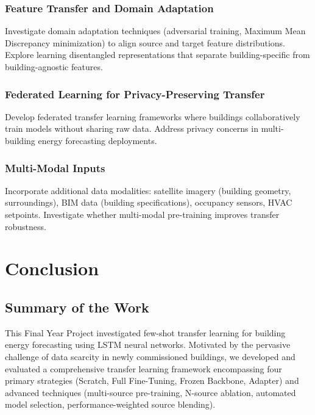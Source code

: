 \documentclass[12pt,a4paper]{report}
\begin{document}
\subsection{Feature Transfer and Domain Adaptation}

Investigate domain adaptation techniques (adversarial training, Maximum Mean Discrepancy minimization) to align source and target feature distributions. Explore learning disentangled representations that separate building-specific from building-agnostic features.

\subsection{Federated Learning for Privacy-Preserving Transfer}

Develop federated transfer learning frameworks where buildings collaboratively train models without sharing raw data. Address privacy concerns in multi-building energy forecasting deployments.

\subsection{Multi-Modal Inputs}

Incorporate additional data modalities: satellite imagery (building geometry, surroundings), BIM data (building specifications), occupancy sensors, HVAC setpoints. Investigate whether multi-modal pre-training improves transfer robustness.


\chapter{Conclusion}

\section{Summary of the Work}

This Final Year Project investigated few-shot transfer learning for building energy forecasting using LSTM neural networks. Motivated by the pervasive challenge of data scarcity in newly commissioned buildings, we developed and evaluated a comprehensive transfer learning framework encompassing four primary strategies (Scratch, Full Fine-Tuning, Frozen Backbone, Adapter) and advanced techniques (multi-source pre-training, N-source ablation, automated model selection, performance-weighted source blending).
\end{document}
